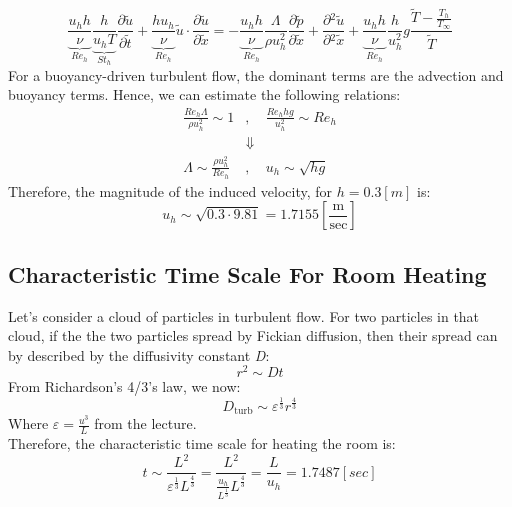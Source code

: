 \documentclass[11pt, a4paper]{article}
\newcommand{\parder}[2]{\frac{\partial {#1}}{\partial {#2}}}
\begin{document}
\begin{equation}
    \underbrace{\frac{u_h h}{\nu}}_\text{$Re_h$}\underbrace{\frac{h}{u_h T}}_\text{$St_h$}\parder{\tilde{u}}{\tilde{t}}+\underbrace{\frac{h u_h}{\nu}}_\text{$Re_h$}\tilde{u}\cdot\parder{\tilde{u}}{\tilde{x}}=-\underbrace{\frac{u_h h}{\nu}}_\text{$Re_h$}\frac{\Lambda}{\rho u_h^2}\parder{\tilde{p}}{\tilde{x}}+\parder{^2\tilde{u}}{^2\tilde{x}}+\underbrace{\frac{u_h h}{\nu}}_\text{$Re_h$}\frac{h}{u_h^2}g\frac{\tilde{T}-\displaystyle\frac{T_h}{T_\infty}}{\tilde{T}}
\end{equation}
For a buoyancy-driven turbulent flow, the dominant terms are the advection and buoyancy terms. Hence, we can estimate the following relations:
\begin{equation}
    \begin{matrix}
        \displaystyle\frac{Re_h\Lambda}{\rho u_h^2}\sim1 &,& \displaystyle\frac{Re_h hg}{u_h^2}\sim Re_h \\
        &\Downarrow& \\
        \displaystyle\Lambda\sim\frac{\rho u_h^2}{Re_h} &,& \displaystyle u_h\sim\sqrt{hg}
    \end{matrix}
\end{equation}
Therefore, the magnitude of the induced velocity, for $h=0.3[m]$ is:
\begin{equation}
    u_h\sim\sqrt{0.3\cdot9.81}=1.7155\left[\frac{\mathrm{m}}{\mathrm{sec}}\right]
\end{equation}

\subsection{Characteristic Time Scale For Room Heating}
Let's consider a cloud of particles in turbulent flow. For two particles in that cloud, if the the two particles spread by Fickian diffusion, then their spread can by described by the diffusivity constant \emph{D}:
\begin{equation}
    r^2\sim Dt
\end{equation}
From Richardson's 4/3's law, we now:
\begin{equation}
    D_\text{turb}\sim\varepsilon^{\frac{1}{3}}r^{\frac{4}{3}}
\end{equation}
Where $\displaystyle\varepsilon=\frac{u^3}{L}$ from the lecture.\\
Therefore, the characteristic time scale for heating the room is:
\begin{equation}
    t\sim\frac{L^2}{\varepsilon^{\frac{1}{3}}L^{\frac{4}{3}}}=\frac{L^2}{\displaystyle\frac{u_h}{L^{\frac{1}{3}}}L^{\frac{4}{3}}}=\frac{L}{u_h}=1.7487[sec]
\end{equation}
\end{document}
